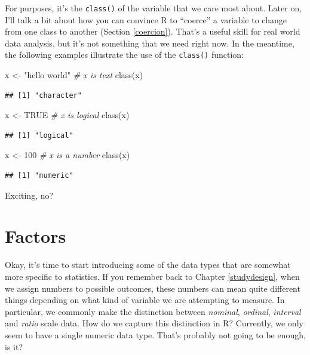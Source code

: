 \documentclass[
]{book}
\newenvironment{Shaded}{\begin{snugshade}}{\end{snugshade}}
\newcommand{\CommentTok}[1]{\textcolor[rgb]{0.56,0.35,0.01}{\textit{#1}}}
\newcommand{\ConstantTok}[1]{\textcolor[rgb]{0.00,0.00,0.00}{#1}}
\newcommand{\DecValTok}[1]{\textcolor[rgb]{0.00,0.00,0.81}{#1}}
\newcommand{\FunctionTok}[1]{\textcolor[rgb]{0.00,0.00,0.00}{#1}}
\newcommand{\NormalTok}[1]{#1}
\newcommand{\OtherTok}[1]{\textcolor[rgb]{0.56,0.35,0.01}{#1}}
\newcommand{\StringTok}[1]{\textcolor[rgb]{0.31,0.60,0.02}{#1}}
\begin{document}
For purposes, it's the \texttt{class()} of the variable that we care most about. Later on, I'll talk a bit about how you can convince R to ``coerce'' a variable to change from one class to another (Section \ref{coercion}). That's a useful skill for real world data analysis, but it's not something that we need right now. In the meantime, the following examples illustrate the use of the \texttt{class()} function:

\begin{Shaded}
\begin{Highlighting}[]
\NormalTok{x }\OtherTok{\textless{}{-}} \StringTok{"hello world"}     \CommentTok{\# x is text}
\FunctionTok{class}\NormalTok{(x)}
\end{Highlighting}
\end{Shaded}

\begin{verbatim}
## [1] "character"
\end{verbatim}

\begin{Shaded}
\begin{Highlighting}[]
\NormalTok{x }\OtherTok{\textless{}{-}} \ConstantTok{TRUE}     \CommentTok{\# x is logical }
\FunctionTok{class}\NormalTok{(x)}
\end{Highlighting}
\end{Shaded}

\begin{verbatim}
## [1] "logical"
\end{verbatim}

\begin{Shaded}
\begin{Highlighting}[]
\NormalTok{x }\OtherTok{\textless{}{-}} \DecValTok{100}     \CommentTok{\# x is a number}
\FunctionTok{class}\NormalTok{(x)}
\end{Highlighting}
\end{Shaded}

\begin{verbatim}
## [1] "numeric"
\end{verbatim}

Exciting, no?

\hypertarget{factors}{%
\section{Factors}\label{factors}}

Okay, it's time to start introducing some of the data types that are somewhat more specific to statistics. If you remember back to Chapter \ref{studydesign}, when we assign numbers to possible outcomes, these numbers can mean quite different things depending on what kind of variable we are attempting to measure. In particular, we commonly make the distinction between \emph{nominal}, \emph{ordinal}, \emph{interval} and \emph{ratio} scale data. How do we capture this distinction in R? Currently, we only seem to have a single numeric data type. That's probably not going to be enough, is it?
\end{document}
